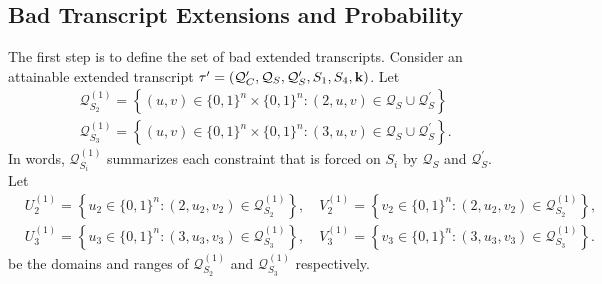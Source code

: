 \subsection{Bad Transcript Extensions and Probability}
\label{sec:bad-tau-4-rounds}

The first step is to define the set of bad extended transcripts. Consider an attainable extended transcript $\tau'=(\mathcal{Q}_{C}',\mathcal{Q}_{S},\mathcal{Q}_{S}',S_1,S_4,\mathbf{k})$. Let
%
$$
\begin{aligned}
&\mathcal{Q}_{S_2}^{(1)}=\left\{(u, v) \in\{0,1\}^{n} \times\{0,1\}^{n}:(2, u, v) \in \mathcal{Q}_{S} \cup \mathcal{Q}_{S}^{\prime}\right\}\\
&\mathcal{Q}_{S_3}^{(1)}=\left\{(u, v) \in\{0,1\}^{n} \times\{0,1\}^{n}:(3, u, v) \in \mathcal{Q}_{S} \cup \mathcal{Q}_{S}^{\prime}\right\}.
\end{aligned}
$$
%
In words, $\mathcal{Q}_{S_{i}}^{(1)}$ summarizes each constraint that is forced on $S_{i}$ by $\mathcal{Q}_{S}$ and $\mathcal{Q}_{S}^{\prime}$. Let        {\small
%
$$
\begin{aligned}
&U_2^{(1)}=\left\{u_2 \in\{0,1\}^{n}:\left(2, u_2, v_2\right) \in \mathcal{Q}_{S_2}^{(1)}\right\}, \quad V_2^{(1)}=\left\{v_2 \in\{0,1\}^{n}:\left(2, u_2, v_2\right) \in \mathcal{Q}_{S_2}^{(1)}\right\},\\
&U_3^{(1)}=\left\{u_3 \in\{0,1\}^{n}:\left(3, u_3, v_3\right) \in \mathcal{Q}_{S_3}^{(1)}\right\}, \quad V_3^{(1)}=\left\{v_3 \in\{0,1\}^{n}:\left(3, u_3, v_3\right) \in \mathcal{Q}_{S_3}^{(1)}\right\}.
\end{aligned}
$$
}%
%
be the domains and ranges of $\mathcal{Q}_{S_2}^{(1)}$ and $\mathcal{Q}_{S_3}^{(1)}$ respectively.




